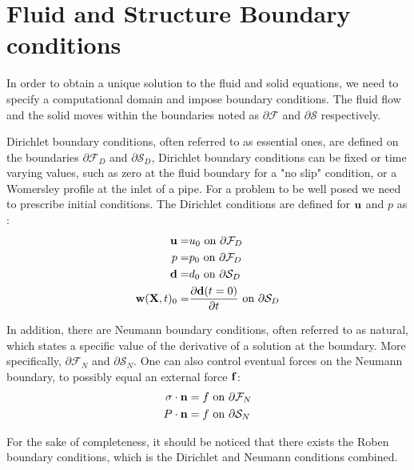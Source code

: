 \section{Fluid and Structure Boundary conditions}
In order to obtain a unique solution to the fluid and solid equations, we need to specify a computational domain and impose boundary conditions. The fluid flow and the solid moves within the boundaries noted as $ \partial\mathcal{F}$ and $ \partial \mathcal{S}$ respectively. 

Dirichlet boundary conditions, often referred to as essential ones, are defined on the boundaries $ \partial \mathcal{F}_D$ and $ \partial \mathcal{S}_D$,
Dirichlet boundary conditions can be fixed or time varying values, such as zero at the fluid boundary for a "no slip" condition, or a Womersley profile at the inlet of a pipe. For a problem to be well posed we need to prescribe initial conditions.
The Dirichlet conditions are defined for $\bold{u}$ and $p$ as :
\begin{align}
\bold{u} =& u_0 \text{   on   } \partial \mathcal{F}_D  \\
p =& p_0 \text{   on   } \partial \mathcal{F}_D  \\
\bold{d} =& d_0 \text{ on   } \partial \mathcal{S}_D  \\
\bold{w}(\textbf{X},t)_0 =& \frac{\partial \bold{d}(t=0)}{\partial t} \text{   on   } \partial \mathcal{S}_D   
\end{align}

In addition, there are Neumann boundary conditions, often referred to as natural, which states a specific value of the derivative of a solution at the boundary. More specifically, $\partial \mathcal{F}_N$ and $\partial \mathcal{S}_N$. One can also control eventual forces on the Neumann boundary, to possibly equal an external force $ \bold{f}$:
\begin{align}
\sigma \cdot \bold{n} &= f \text{   on   } \partial \mathcal{F}_N \\   
P\cdot \bold{n} &= f \text{   on   } \partial \mathcal{S}_N    
\end{align}

For the sake of completeness, it should be noticed that there exists the Roben boundary conditions, which is the Dirichlet and Neumann conditions combined.
